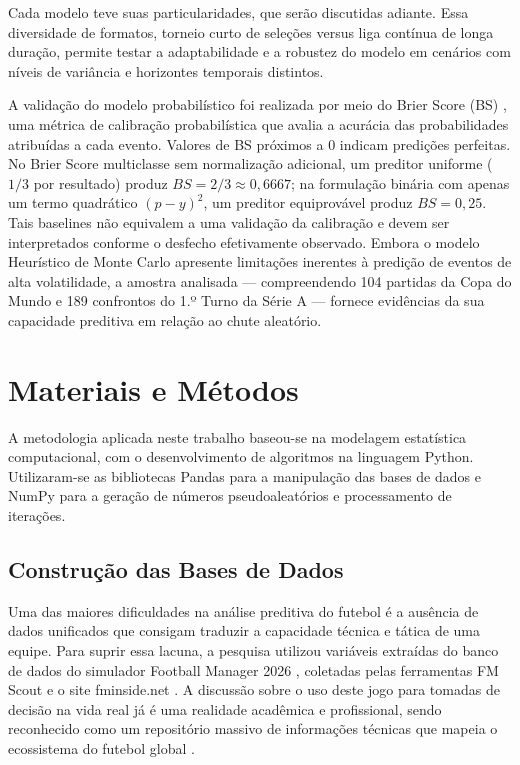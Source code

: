 \documentclass[12pt]{article}
\begin{document}
Cada modelo teve suas particularidades, que serão discutidas adiante. Essa diversidade de formatos, torneio curto de seleções versus liga contínua de longa duração, permite testar a adaptabilidade e a robustez do modelo em cenários com níveis de variância e horizontes temporais distintos.  

A validação do modelo probabilístico foi realizada por meio do Brier Score (BS) \cite{steyerberg2010assessing}, uma métrica de calibração probabilística que avalia a acurácia das probabilidades atribuídas a cada evento. Valores de BS próximos a 0 indicam predições perfeitas. No Brier Score multiclasse sem normalização adicional, um preditor uniforme ($1/3$ por resultado) produz $BS=2/3\approx 0{,}6667$; na formulação binária com apenas um termo quadrático $(p-y)^2$, um preditor equiprovável produz $BS=0{,}25$. Tais baselines não equivalem a uma validação da calibração e devem ser interpretados conforme o desfecho efetivamente observado. Embora o modelo Heurístico de Monte Carlo apresente limitações inerentes à predição de eventos de alta volatilidade, a amostra analisada — compreendendo 104 partidas da Copa do Mundo e 189 confrontos do 1.º Turno da Série A — fornece evidências da sua capacidade preditiva em relação ao chute aleatório.



\section{Materiais e Métodos}

A metodologia aplicada neste trabalho baseou-se na modelagem estatística computacional, com o desenvolvimento de algoritmos na linguagem Python. Utilizaram-se as bibliotecas Pandas para a manipulação das bases de dados e NumPy para a geração de números pseudoaleatórios e processamento de iterações.

\subsection{Construção das Bases de Dados}
Uma das maiores dificuldades na análise preditiva do futebol é a ausência de dados unificados que consigam traduzir a capacidade técnica e tática de uma equipe. Para suprir essa lacuna, a pesquisa utilizou variáveis extraídas do banco de dados do simulador Football Manager 2026 \cite{fm2026}, coletadas pelas ferramentas FM Scout \cite{fmscout2025} e o site fminside.net \cite{fminside2025}. A discussão sobre o uso deste jogo para tomadas de decisão na vida real já é uma realidade acadêmica e profissional, sendo reconhecido como um repositório massivo de informações técnicas que mapeia o ecossistema do futebol global \cite{hocquet2016football}. 
\end{document}
